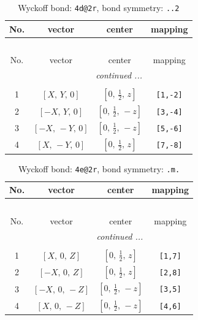 \documentclass[fleqn,8pt]{jsarticle}
\begin{document}
\begin{longtable}{cccc}
\caption{Wyckoff bond: {\tt 4d@2r}, bond symmetry: {\tt ..2}}
 \\
 \hline \hline
No. & vector & center & mapping \\ \hline \endfirsthead

\multicolumn{3}{l}{\tablename\ \thetable{}} \\
 \hline \hline
No. & vector & center & mapping \\ \hline \endhead

 \hline \hline
\multicolumn{3}{r}{\footnotesize\it continued ...} \\ \endfoot

 \hline \hline
\multicolumn{3}{r}{} \\ \endlastfoot

1 & $\left[ X,\, Y,\, 0 \right]$ & $\left[ 0,\, \frac{1}{2},\, z \right]$ & {\tt [1,-2]} \\ \hline
2 & $\left[ - X,\, Y,\, 0 \right]$ & $\left[ 0,\, \frac{1}{2},\, - z \right]$ & {\tt [3,-4]} \\ \hline
3 & $\left[ - X,\, - Y,\, 0 \right]$ & $\left[ 0,\, \frac{1}{2},\, - z \right]$ & {\tt [5,-6]} \\ \hline
4 & $\left[ X,\, - Y,\, 0 \right]$ & $\left[ 0,\, \frac{1}{2},\, z \right]$ & {\tt [7,-8]} \\
\end{longtable}
\renewcommand{\arraystretch}{1.2}
\begin{longtable}{cccc}
\caption{Wyckoff bond: {\tt 4e@2r}, bond symmetry: {\tt .m.}}
 \\
 \hline \hline
No. & vector & center & mapping \\ \hline \endfirsthead

\multicolumn{3}{l}{\tablename\ \thetable{}} \\
 \hline \hline
No. & vector & center & mapping \\ \hline \endhead

 \hline \hline
\multicolumn{3}{r}{\footnotesize\it continued ...} \\ \endfoot

 \hline \hline
\multicolumn{3}{r}{} \\ \endlastfoot

1 & $\left[ X,\, 0,\, Z \right]$ & $\left[ 0,\, \frac{1}{2},\, z \right]$ & {\tt [1,7]} \\ \hline
2 & $\left[ - X,\, 0,\, Z \right]$ & $\left[ 0,\, \frac{1}{2},\, z \right]$ & {\tt [2,8]} \\ \hline
3 & $\left[ - X,\, 0,\, - Z \right]$ & $\left[ 0,\, \frac{1}{2},\, - z \right]$ & {\tt [3,5]} \\ \hline
4 & $\left[ X,\, 0,\, - Z \right]$ & $\left[ 0,\, \frac{1}{2},\, - z \right]$ & {\tt [4,6]} \\
\end{longtable}
\end{document}
